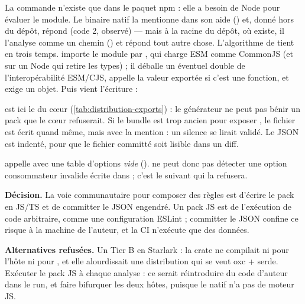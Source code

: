 La commande n'existe que dans le paquet npm : elle a besoin de Node pour évaluer le module. Le binaire natif la mentionne dans son aide (\og {}\fg{}) et, donné hors du dépôt, répond  (code 2, observé) — mais à la racine du dépôt, où  existe, il l'analyse comme un chemin () et répond tout autre chose. L'algorithme de  tient en trois temps.  importe le module par , qui charge ESM comme CommonJS (et  sur un Node qui retire les types) ; il déballe un éventuel double  de l'interopérabilité ESM/CJS, appelle la valeur exportée si c'est une fonction, et exige un objet. Puis vient l'écriture :


 est ici le  du cœur (\cref{tab:distribution-exports}) : le générateur ne peut pas bénir un pack que le cœur refuserait. Si le bundle est trop ancien pour exposer , le fichier est écrit quand même, mais avec la mention  : un silence se lirait \og validé\fg{}. Le JSON est indenté, pour que le fichier committé soit lisible dans un diff.

\begin{piege}
 appelle  avec une table d'options \emph{vide} ().  ne peut donc pas détecter une option consommateur invalide écrite dans  ; c'est le  suivant qui la refusera.
\end{piege}

\begin{decision}
\textbf{Décision.} La voie communautaire pour composer des règles est d'écrire le pack en JS/TS et de committer le JSON engendré. Un pack JS est de l'exécution de code arbitraire, comme une configuration ESLint ; committer le JSON confine ce risque à la machine de l'auteur, et la CI n'exécute que des données.

\textbf{Alternatives refusées.} Un Tier B en Starlark : la crate  ne compilait ni pour l'hôte ni pour , et elle alourdissait une distribution qui se veut \og oxc + serde\fg{}. Exécuter le pack JS à chaque analyse : ce serait réintroduire du code d'auteur dans le run, et faire bifurquer les deux hôtes, puisque le natif n'a pas de moteur JS.
\end{decision}

